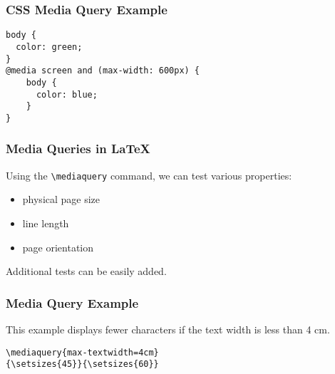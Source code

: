 \begin{frame}[fragile]
\frametitle{CSS Media Query Example}
\begin{verbatim}
body {
  color: green;
}
@media screen and (max-width: 600px) {
    body {
      color: blue;
    }
}
\end{verbatim}
\end{frame}
          
\begin{frame}[fragile]
  \frametitle{Media Queries in \LaTeX}
    Using the \verb|\mediaquery| command, we can test various properties:
  
    \begin{itemize}
  \item physical page size
  \item line length
  \item page orientation
\end{itemize}

Additional tests can be easily added.

\end{frame}

\begin{frame}[fragile]

  \frametitle{Media Query Example}

  This example displays fewer characters if the text width is less than 4 cm.

\begin{verbatim}
\mediaquery{max-textwidth=4cm}
{\setsizes{45}}{\setsizes{60}}
\end{verbatim}
\begin{columns}
  \begin{column}{0.5\textwidth}

\end{column}
  \begin{column}{0.5\textwidth}

\end{column}
\end{columns}

\end{frame}

